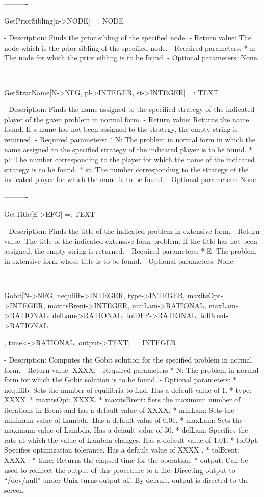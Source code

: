 {----------

GetPriorSibling[n->NODE] =: NODE

   -	Description:  Finds the prior sibling of the specified node.
   -	Return value:  The node which is the prior sibling of the specified 
	node.
   -	Required parameters:
	  *  n:  The node for which the prior sibling is to be found.
   -	Optional parameters:  None.

----------

GetStratName[N->NFG, pl->INTEGER, st->INTEGER] =: TEXT

   -	Description:  Finds the name assigned to the specified strategy of the
	indicated player of the given problem in normal form.
   -	Return value:  Returns the name found.  If a name has not been assigned
	to the strategy, the empty string is returned.
   -	Required parameters:
	  *  N:  The problem in normal form in which the name assigned to the 
		specified strategy of the indicated player is to be found.
	  *  pl:  The number corresponding to the player for which the name of
		the indicated strategy is to be found.
	  *  st:  The number corresponding to the strategy of the indicated 
		player for which the name is to be found.
   -	Optional parameters:  None.

----------

GetTitle[E->EFG] =: TEXT

   -	Description:  Finds the title of the indicated problem in extensive 
	form.
   -	Return value:  The title of the indicated extensive form problem.  If
	the title has not been assigned, the empty string is returned.
   -	Required parameters:
	  *  E:  The problem in extensive form whose title is to be found.
   -	Optional parameters:  None.

----------

Gobit[N->NFG, {nequilib->INTEGER}, {type->INTEGER},
	{maxitsOpt->INTEGER}, {maxitsBrent->INTEGER}, {minLam->RATIONAL},
	{maxLam->RATIONAL}, {delLam->RATIONAL}, {tolDFP->RATIONAL},
	{tolBrent}->RATIONAL}, {time<->RATIONAL}, {output->TEXT}] =: INTEGER

   -	Description:  Computes the Gobit solution for the specified problem in
	normal form.  
   -	Return value:  XXXX.
   -	Required parameters
	  *  N:  The problem in normal form for which the Gobit solution is to
		be found.
   -	Optional parameters:
	  *  nequilib:  Sets the number of equilibria to find.  Has a default 
		value of 1.  
	  *  type:   XXXX.  
	  *  maxitsOpt:  XXXX.
	  *  maxitsBrent:  Sets the maximum number of iterations in Brent and 
		has a default value of XXXX.  
	  *  minLam:  Sets the minimum value of Lambda.  Has a default value of
		0.01.
	  *  maxLam:  Sets the maximum value of Lambda.  Has a default value of
		30.
	  *  delLam:  Specifies the rate at which the value of Lambda changes.
		Has a default value of 1.01.
	  *  tolOpt:  Specifies optimization tolerance.  Has a default value of
		XXXX .
	  *  tolBrent:  XXXX .
	  *  time:  Returns the elapsed time for the operation.
	  *  output:  Can be used to redirect the output of this procedure to a
		file.  Directing output to ``/dev/null'' under Unix turns 
		output off.  By default, output is directed to the screen.

